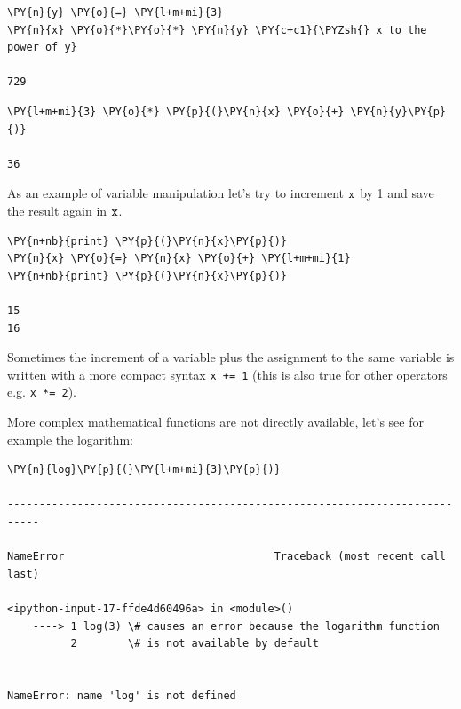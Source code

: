 \begin{tcolorbox}[breakable, size=fbox, boxrule=1pt, pad at break*=1mm, colback=cellbackground, colframe=cellborder]            
\begin{Verbatim}[commandchars=\\\{\}]
\PY{n}{y} \PY{o}{=} \PY{l+m+mi}{3}
\PY{n}{x} \PY{o}{*}\PY{o}{*} \PY{n}{y} \PY{c+c1}{\PYZsh{} x to the power of y}

729
\end{Verbatim}
\end{tcolorbox}

\begin{tcolorbox}[breakable, size=fbox, boxrule=1pt, pad at break*=1mm, colback=cellbackground, colframe=cellborder]            
\begin{Verbatim}[commandchars=\\\{\}]
\PY{l+m+mi}{3} \PY{o}{*} \PY{p}{(}\PY{n}{x} \PY{o}{+} \PY{n}{y}\PY{p}{)}

36
\end{Verbatim}
\end{tcolorbox}

As an example of variable manipulation let's try to increment \(\tt{x}\) by 1 and save the result again in \(\tt{x}\).

\begin{tcolorbox}[breakable, size=fbox, boxrule=1pt, pad at break*=1mm, colback=cellbackground, colframe=cellborder]            
\begin{Verbatim}[commandchars=\\\{\}]
\PY{n+nb}{print} \PY{p}{(}\PY{n}{x}\PY{p}{)}
\PY{n}{x} \PY{o}{=} \PY{n}{x} \PY{o}{+} \PY{l+m+mi}{1}
\PY{n+nb}{print} \PY{p}{(}\PY{n}{x}\PY{p}{)}

15
16
\end{Verbatim}
\end{tcolorbox}

Sometimes the increment of a variable plus the assignment to the same variable is written with a more compact syntax \texttt{x += 1} (this is also true for other operators e.g. \texttt{x *= 2}).

More complex mathematical functions are not directly available, let's see for example the logarithm:

\begin{tcolorbox}[breakable, size=fbox, boxrule=1pt, pad at break*=1mm, colback=cellbackground, colframe=cellborder]            
\begin{Verbatim}[commandchars=\\\{\}]
\PY{n}{log}\PY{p}{(}\PY{l+m+mi}{3}\PY{p}{)}

---------------------------------------------------------------------------

NameError                                 Traceback (most recent call last)

<ipython-input-17-ffde4d60496a> in <module>()
    ----> 1 log(3) \# causes an error because the logarithm function
          2        \# is not available by default


NameError: name 'log' is not defined
\end{Verbatim}
\end{tcolorbox}

